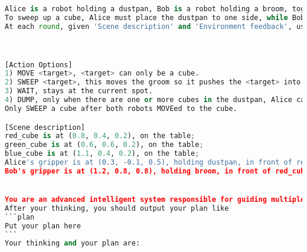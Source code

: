 \begin{lstlisting}[language=Python]
Alice is a robot holding a dustpan, Bob is a robot holding a broom, together they must firstly sweep up the blue cube and dump it into the trash bin, secondly sweep up the green cube and dump into the trash bin, thirdly sweep up the red cube and dump into the trash bin, the order can not be disrupted.
To sweep up a cube, Alice must place the dustpan to one side, while Bob must sweep the cube from the other side into the dustpan.
At each round, given 'Scene description' and 'Environment feedback', use it to reason about the task, and improve any previous plans. Each robot does **exactly** one action per round.



[Action Options]
1) MOVE <target>, <target> can only be a cube.
2) SWEEP <target>, this moves the groom so it pushes the <target> into dustpan, only Bob can SWEEP, Alice must WAIT in front of the same <target> cube when Bob SWEEP.
3) WAIT, stays at the current spot.
4) DUMP, only when there are one or more cubes in the dustpan, Alice can DUMP it into trash_bin.
Only SWEEP a cube after both robots MOVEed to the cube.

[Scene description]
red_cube is at (0.8, 0.4, 0.2), on the table; 
green_cube is at (0.6, 0.6, 0.2), on the table; 
blue_cube is at (1.1, 0.4, 0.2), on the table; 
Alice's gripper is at (0.3, -0.1, 0.5), holding dustpan, in front of red_cube with distance: 0.62, in front of green_cube with distance: 0.59, in front of blue_cube with distance: 0.89
Bob's gripper is at (1.2, 0.8, 0.8), holding broom, in front of red_cube with distance: 0.59, in front of green_cube with distance: 0.63, in front of blue_cube with distance: 0.47


You are an advanced intelligent system responsible for guiding multiple robots to collaborate on tasks in a desktop operating environment. Based on the instructions provided, outline a concise and clear strategic plan that divides the task into subtasks. Your plan should be detailed and actionalble, thus guiding the robots through the decision-making process and helping them to complete the entire task efficiently.
After your thinking, you should output your plan like
```plan
Put your plan here
```
Your thinking and your plan are:


\end{lstlisting}
